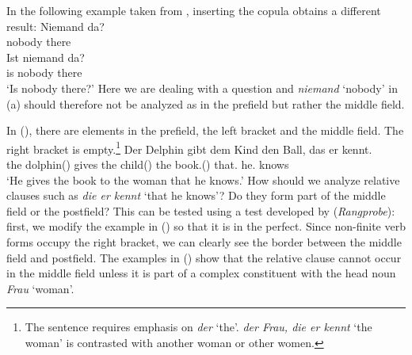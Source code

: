 In the following example taken from \citet[]{Paul1919a}, inserting the copula obtains a different result: 
\eal
\ex 
\gll Niemand da?\\
	 nobody there\\
\ex 
\gll Ist niemand da?\\
	 is nobody there\\
\glt `Is nobody there?'
\zl
Here we are dealing with a question and \emph{niemand} `nobody' in (a) should therefore not be analyzed as in the prefield but rather the middle field.

In (), there are elements in the prefield, the left bracket and the middle field. The right
bracket is empty.\footnote{%
  The sentence requires emphasis on \emph{der} `the'. \emph{der Frau, die er kennt} `the woman' is
  contrasted with another woman or other women.
}
\ea
\gll Der Delphin  gibt  dem Kind        den Ball,       das er kennt.\\
     the dolphin(\mas) gives the child(\neu) the book.(\mas) that.\neu{} he.\mas{} knows\\
\glt `He gives the book to the woman that he knows.'
\z 
How should we analyze relative clauses such as
\emph{die er kennt} `that he knows'? Do they form part of the middle field or the postfield?
This can be tested using a test developed by \citet[]{Bech55a} (\emph{Rangprobe}):
first, we modify the example in () so that it is in the perfect. Since non-finite verb forms occupy the right bracket, we
can clearly see the border between the middle field and postfield. The examples in () show that the relative clause cannot
occur in the middle field unless it is part of a complex constituent with the head noun \emph{Frau} `woman'.
\eal
{}
\zl

